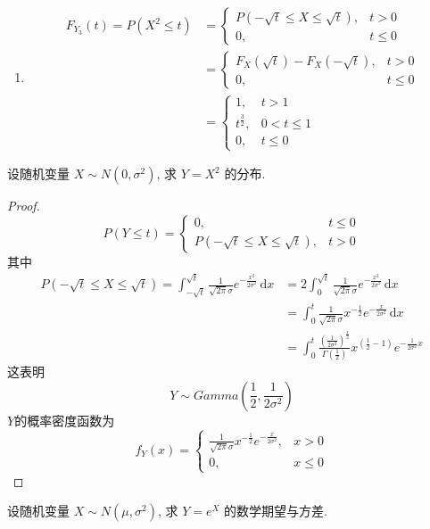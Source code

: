 \documentclass[../main.tex]{subfiles}
\begin{document}
\begin{solution}
\begin{enumerate}
\[\begin{aligned}
    \end{aligned}  
    \]
    \item \[
    \begin{aligned}
    F_{Y_3}\left( t \right)= P\left( X^{2}\le t \right) & = \begin{cases} P\left( -\sqrt{t}\le X\le \sqrt{t} \right),&t> 0\\ 
     0,&t\le 0  \end{cases} \\ 
      &= \begin{cases} F_{X}\left( \sqrt{t} \right)-F_{X}\left( -\sqrt{t} \right),&t> 0\\ 
       0,& t\le 0   \end{cases}\\ 
        &= \begin{cases} 1,& t> 1\\ 
         t^{\frac{3}{2}},& 0< t\le 1\\ 
          0,&t\le 0 \end{cases}  
    \end{aligned}
    \]
  \end{enumerate}
  
\end{solution}

\begin{exercise}{}{}
设随机变量 $X \sim N(0, \sigma^2)$, 求 $Y = X^2$ 的分布.
\end{exercise}
\begin{proof}
  \[
  P\left( Y\le t \right)= \begin{cases} 0,& t\le 0\\ 
   P\left(-\sqrt{t}\le  X\le \sqrt{t} \right),& t> 0  \end{cases}  
  \]其中 \[
  \begin{aligned}
  P\left( -\sqrt{t}\le X\le \sqrt{t} \right)= \int_{-\sqrt{t}}^{\sqrt{t}}\frac{1 }{\sqrt{2 \pi } \sigma  }e^{-\frac{x^{2} }{2 \sigma ^{2} } }   \,\mathrm{d} x&= 2\int_{0}^{\sqrt{t}}\frac{1 }{\sqrt{2 \pi } \sigma  }e^{-\frac{x^{2} }{2 \sigma ^{2} } }\,\mathrm{d} x \\ 
   &= \int_{0}^{t} \frac{1 }{\sqrt{2 \pi } \sigma  }x^{-\frac{1 }{2 } }e^{-\frac{x }{2 \sigma ^{2} } } \,\mathrm{d}x\\ 
    &= \int_{0}^{t}\frac{\left( \frac{1 }{2 \sigma ^{2} }  \right)^{\frac{1 }{2 } }  }{  \Gamma \left( \frac{1 }{2 }  \right) }x^{\left( \frac{1 }{2 }-1  \right) }e^{-\frac{1 }{2 \sigma ^{2} }x } 
  \end{aligned}
  \]这表明 \[
  Y\sim Gamma(\frac{1 }{2 }, \frac{1 }{2 \sigma ^{2} }  )
  \]\(  Y  \)的概率密度函数为  \[
  f_{Y}\left( x \right)= \begin{cases} \frac{1 }{\sqrt{2 \pi } \sigma } x^{-\frac{1 }{2 } }e^{-\frac{x }{2 \sigma ^{2} } },& x> 0\\ 
   0,& x\le 0 \end{cases}  
  \]
\end{proof}
\begin{exercise}{}{}
设随机变量 $X \sim N(\mu, \sigma^2)$, 求 $Y = e^X$ 的数学期望与方差.
\end{exercise}
\end{document}

